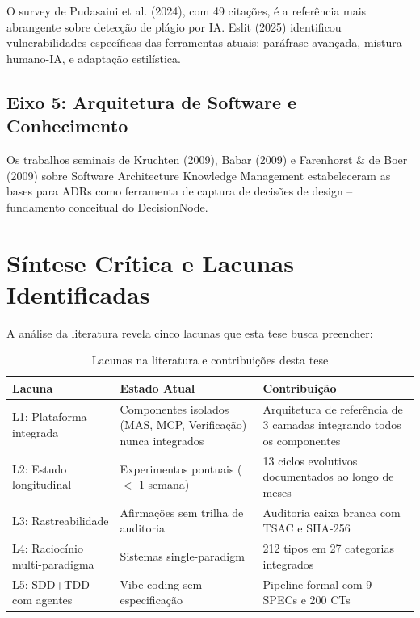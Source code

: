 \documentclass[12pt,a4paper,sumario=tradicional]{abntex2}
\begin{document}
O survey de Pudasaini et al. (2024), com 49 citações, é a referência mais abrangente sobre detecção de plágio por IA. Eslit (2025) identificou vulnerabilidades específicas das ferramentas atuais: paráfrase avançada, mistura humano-IA, e adaptação estilística.

\subsection{Eixo 5: Arquitetura de Software e Conhecimento}

Os trabalhos seminais de Kruchten (2009), Babar (2009) e Farenhorst \& de Boer (2009) sobre Software Architecture Knowledge Management estabeleceram as bases para ADRs como ferramenta de captura de decisões de design -- fundamento conceitual do DecisionNode.

\section{Síntese Crítica e Lacunas Identificadas}

A análise da literatura revela cinco lacunas que esta tese busca preencher:

\begin{table}[H]
\centering
\caption{Lacunas na literatura e contribuições desta tese}
\label{tab:gaps}
\begin{tabular}{@{}lp{5cm}p{5cm}@{}}
\toprule
\textbf{Lacuna} & \textbf{Estado Atual} & \textbf{Contribuição} \\
\midrule
L1: Plataforma integrada & Componentes isolados (MAS, MCP, Verificação) nunca integrados & Arquitetura de referência de 3 camadas integrando todos os componentes \\
L2: Estudo longitudinal & Experimentos pontuais ($<$ 1 semana) & 13 ciclos evolutivos documentados ao longo de meses \\
L3: Rastreabilidade & Afirmações sem trilha de auditoria & Auditoria caixa branca com TSAC e SHA-256 \\
L4: Raciocínio multi-paradigma & Sistemas single-paradigm & 212 tipos em 27 categorias integrados \\
L5: SDD+TDD com agentes & Vibe coding sem especificação & Pipeline formal com 9 SPECs e 200 CTs \\
\bottomrule
\end{tabular}
\end{table}

\end{document}
